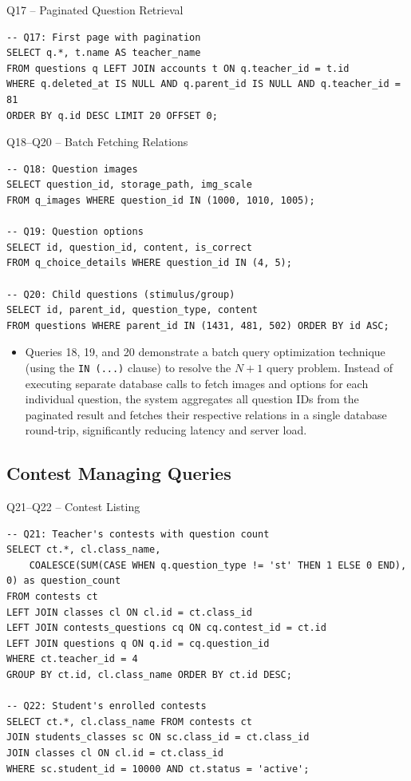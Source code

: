 \documentclass[aspectratio=169, 10pt]{beamer}
\begin{document}
\begin{frame}[fragile]{Q17 -- Paginated Question Retrieval}
    \begin{lstlisting}
-- Q17: First page with pagination
SELECT q.*, t.name AS teacher_name
FROM questions q LEFT JOIN accounts t ON q.teacher_id = t.id
WHERE q.deleted_at IS NULL AND q.parent_id IS NULL AND q.teacher_id = 81
ORDER BY q.id DESC LIMIT 20 OFFSET 0;
    \end{lstlisting}
\end{frame}


\begin{frame}[fragile]{Q18--Q20 -- Batch Fetching Relations}
\begin{lstlisting}
-- Q18: Question images
SELECT question_id, storage_path, img_scale 
FROM q_images WHERE question_id IN (1000, 1010, 1005);

-- Q19: Question options
SELECT id, question_id, content, is_correct 
FROM q_choice_details WHERE question_id IN (4, 5);

-- Q20: Child questions (stimulus/group)
SELECT id, parent_id, question_type, content 
FROM questions WHERE parent_id IN (1431, 481, 502) ORDER BY id ASC;
\end{lstlisting}
    \vspace{0.2cm}
    \begin{itemize}
        \item Queries 18, 19, and 20 demonstrate a batch query optimization technique (using the \texttt{IN (...)} clause) to resolve the $N+1$ query problem. Instead of executing separate database calls to fetch images and options for each individual question, the system aggregates all question IDs from the paginated result and fetches their respective relations in a single database round-trip, significantly reducing latency and server load.
    \end{itemize}
\end{frame}


\subsection{Contest Managing Queries}

\begin{frame}[fragile]{Q21--Q22 -- Contest Listing}
    \begin{lstlisting}
-- Q21: Teacher's contests with question count
SELECT ct.*, cl.class_name,
    COALESCE(SUM(CASE WHEN q.question_type != 'st' THEN 1 ELSE 0 END), 0) as question_count
FROM contests ct
LEFT JOIN classes cl ON cl.id = ct.class_id
LEFT JOIN contests_questions cq ON cq.contest_id = ct.id
LEFT JOIN questions q ON q.id = cq.question_id
WHERE ct.teacher_id = 4
GROUP BY ct.id, cl.class_name ORDER BY ct.id DESC;

-- Q22: Student's enrolled contests
SELECT ct.*, cl.class_name FROM contests ct
JOIN students_classes sc ON sc.class_id = ct.class_id
JOIN classes cl ON cl.id = ct.class_id
WHERE sc.student_id = 10000 AND ct.status = 'active';
    \end{lstlisting}
\end{frame}
\end{document}
